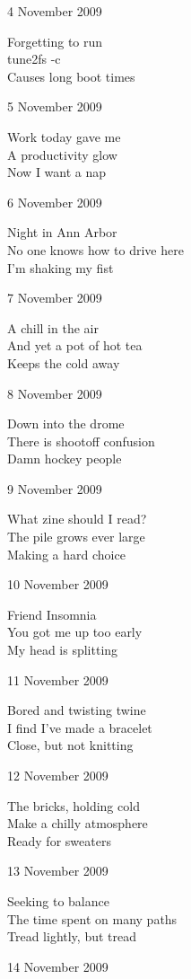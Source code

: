 \documentclass[12pt]{article}
\begin{document}
4 November 2009

Forgetting to run \\
tune2fs -c  \\
Causes long boot times

5 November 2009

Work today gave me \\
A productivity glow \\
Now I want a nap

6 November 2009

Night in Ann Arbor \\
No one knows how to drive here \\
I'm shaking my fist

7 November 2009

A chill in the air \\
And yet a pot of hot tea \\
Keeps the cold away

8 November 2009

Down into the drome \\
There is shootoff confusion \\
Damn hockey people

9 November 2009

What zine should I read? \\
The pile grows ever large \\
Making a hard choice

\newpage

10 November 2009

Friend Insomnia \\
You got me up too early \\
My head is splitting

11 November 2009

Bored and twisting twine \\
I find I've made a bracelet \\
Close, but not knitting

12 November 2009

The bricks, holding cold \\
Make a chilly atmosphere \\
Ready for sweaters

13 November 2009

Seeking to balance \\
The time spent on many paths \\
Tread lightly, but tread

14 November 2009
\end{document}
